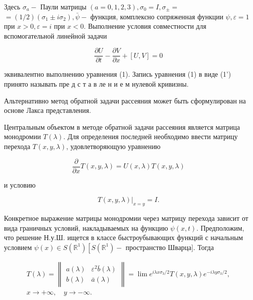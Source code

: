 \documentclass[10pt]{article}
\begin{document}
Здесь $\sigma_{a}-$ Паули матрицы $(a=0,1,2,3), \sigma_{0}=I, \sigma_{ \pm}=$ $=(1 / 2)\left(\sigma_{1} \pm i \sigma_{2}\right), \bar{\psi}-$ функция, комплексно сопряженная функции $\psi, \varepsilon=1$ при $x>0, \varepsilon=i$ при $x<0$. Выполнение условия совместности для вспомогательной линейной задачи



\[

\frac{\partial U}{\partial t}-\frac{\partial V}{\partial x}+[U, V]=0

\]



эквивалентно выполнению уравнения (1). Запись уравнения (1) в виде (1') принято называть пре д с т а в ле н и е м нулевой кривизны.



Альтернативно метод обратной задачи рассеяния может быть сформулирован на основе Лакса представления.



Центральным объектом в методе обратной задачи рассеяния является матрица монодромии $T(\lambda)$. Для определения последней необходимо ввести матрицу перехода $T(x, y, \lambda)$, удовлетворяющую уравнению



\[

\frac{\partial}{\partial x} T(x, y, \lambda)=U(x, \lambda) T(x, y, \lambda)

\]



и условию



\[

\left.T(x, y, \lambda)\right|_{x=y}=I .

\]



Конкретное выражение матрицы монодромии через матрицу перехода зависит от вида граничных условий, накладываемых на функцию $\psi(x, t)$. Предположим, что решение Н.у.Ш. ищется в классе быстроубывающих функций с начальным условием $\psi(x) \in S\left(\mathbb{R}^{1}\right)\left[S\left(\mathbb{R}^{1}\right)-\right.$ пространство Шварца]. Тогда



\[

\begin{gathered}

T(\lambda)=\left\|\begin{array}{cc}

a(\lambda) & \varepsilon^{2} \bar{b}(\lambda) \\

b(\lambda) & \bar{a}(\lambda)

\end{array}\right\|=\lim e^{i \lambda x \sigma_{3} / 2} T(x, y, \lambda) e^{-i \lambda y \sigma_{3} / 2}, \\

x \rightarrow+\infty, \quad y \rightarrow-\infty .

\end{gathered}

\]
\end{document}
